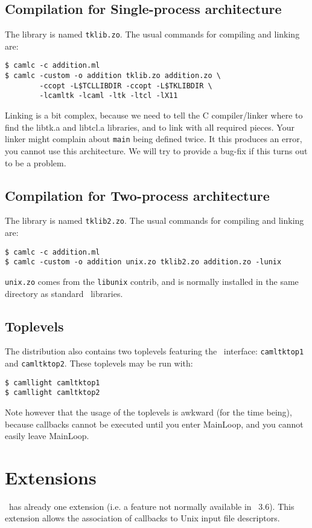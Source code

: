 \subsection{Compilation for Single-process architecture}
The library is named \verb|tklib.zo|.
The usual commands for compiling and linking are:
\begin{verbatim}
$ camlc -c addition.ml
$ camlc -custom -o addition tklib.zo addition.zo \
        -ccopt -L$TCLLIBDIR -ccopt -L$TKLIBDIR \
        -lcamltk -lcaml -ltk -ltcl -lX11
\end{verbatim}
Linking is a bit complex, because we need to tell the C compiler/linker
where to find the libtk.a and libtcl.a libraries, and to link with all
required pieces. Your linker might complain about \verb|main| being defined
twice. It this produces an error, you cannot use this architecture.
We will try to provide a bug-fix if this turns out to be a problem.

\subsection{Compilation for Two-process architecture}
The library is named \verb|tklib2.zo|.
The usual commands for compiling and linking are:
\begin{verbatim}
$ camlc -c addition.ml
$ camlc -custom -o addition unix.zo tklib2.zo addition.zo -lunix
\end{verbatim} 
 \verb|unix.zo| comes from the \verb|libunix| contrib, and is normally
installed in the same directory as standard \caml\ libraries. 

\subsection{Toplevels}
The distribution also contains two toplevels featuring the \camltk\
interface: \verb|camltktop1| and \verb|camltktop2|.
These toplevels may be run with: 
\begin{verbatim}
$ camllight camltktop1
$ camllight camltktop2
\end{verbatim} 
Note however that the usage of the toplevels is awkward (for the time
being), because callbacks cannot be executed until you enter MainLoop, and
you cannot easily leave MainLoop.

\section{Extensions}
\camltk\ has already one extension (i.e. a feature not normally available in
\tk\ 3.6). This extension allows the association of callbacks to Unix input
file descriptors.

